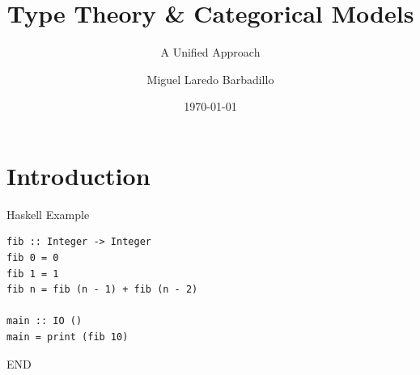 \documentclass[aspectratio=169]{beamer}
\title{Type Theory \& Categorical Models}
\subtitle{A Unified Approach}
\date{\today}
\author{Miguel Laredo Barbadillo}
\institute{Master's in Formal Methods in Computer Science}
\begin{document}
\maketitle

\section{Introduction}
\begin{frame}[fragile]{Haskell Example}
\begin{verbatim}
fib :: Integer -> Integer
fib 0 = 0
fib 1 = 1
fib n = fib (n - 1) + fib (n - 2)

main :: IO ()
main = print (fib 10)
\end{verbatim}
\end{frame}

\begin{frame}[standout]
  END
\end{frame}
\end{document}
